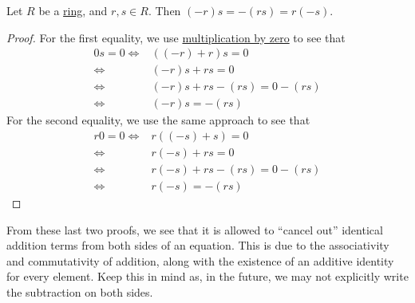 \documentclass{scrartcl}
\begin{document}
\begin{proposition}
    Let $R$ be a \hyperref[def:ring]{ring}, and $r,s\in R$.
    Then $(-r)s=-(rs)=r(-s)$.
\end{proposition}

\begin{proof}
    For the first equality, we use \hyperref[prop:multiply by zero]{multiplication by zero} to see that
    \begin{align}
        0s=0
        \iff& ((-r)+r)s=0 \\
        \iff& (-r)s+rs=0 \\
        \iff& (-r)s+rs-(rs)=0-(rs) \\
        \iff& (-r)s=-(rs)
    \end{align}
    For the second equality, we use the same approach to see that
    \begin{align}
        r0=0
        \iff& r((-s)+s)=0 \\
        \iff& r(-s)+rs=0 \\
        \iff& r(-s)+rs-(rs)=0-(rs) \\
        \iff& r(-s)=-(rs)
    \end{align}
\end{proof}

\begin{remark}
    From these last two proofs, we see that it is allowed to ``cancel out'' identical addition terms from both sides of
    an equation.
    This is due to the associativity and commutativity of addition, along with the existence of an additive identity
    for every element.
    Keep this in mind as, in the future, we may not explicitly write the subtraction on both sides.
\end{remark}
\end{document}
